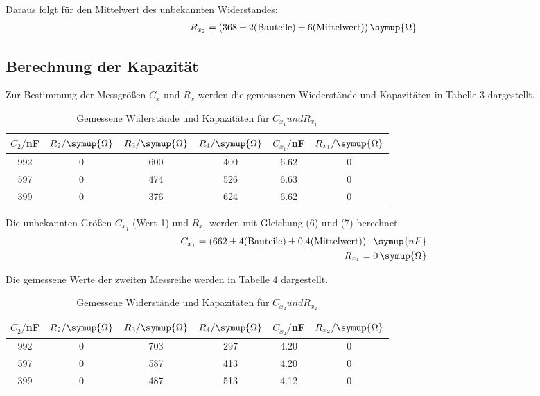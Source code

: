 Daraus folgt für den Mittelwert des unbekannten Widerstandes:
\begin{align*}
  R_{x_2} = (368 \pm 2\text{(Bauteile)} \pm 6\text{(Mittelwert)}) \, \symup{\Omega}
\end{align*}


\subsection{Berechnung der Kapazität}
Zur Bestimmung der Messgrößen $C_x$ und $R_x$ werden die gemessenen Wiederstände und Kapazitäten in
Tabelle 3 dargestellt.

\begin{table}[H]
  \centering
  \caption{Gemessene Widerstände und Kapazitäten für $C_{x_1} und R_{x_1}$}
  \label{tab:Widerstand}
  \begin{tabular}{c c c c c c}
    \toprule
    $C_2/$nF & $R_2/ \symup{\Omega}$ & $R_3/ \symup{\Omega}$ & $R_4 / \symup{\Omega}$ & $C_{x_1}/$nF & $R_{x_1} / \symup{\Omega}$\\
    \midrule
    992 & 0 & 600 & 400 & 6.62  & 0\\
    597 & 0 & 474 & 526 & 6.63  & 0\\
    399 & 0 & 376 & 624 & 6.62  & 0\\
    \bottomrule
  \end{tabular}
\end{table}

Die unbekannten Größen $C_{x_1}$ (Wert 1) und $R_{x_1}$ werden mit Gleichung (6) und (7) berechnet.
\begin{align*}
  C_{x_1} = (662 \pm 4\text{(Bauteile)} \pm 0.4\text{(Mittelwert)}) \cdot  \symup{nF} \\
  R_{x_1} = 0  \, \symup{\Omega}
\end{align*}

Die gemessene Werte der zweiten Messreihe werden in Tabelle 4 dargestellt.

\begin{table}[H]
  \centering
  \caption{Gemessene Widerstände und Kapazitäten für $C_{x_2} und R_{x_2}$}
  \label{tab:Widerstand}
  \begin{tabular}{c c c c c c}
    \toprule
    $C_2/$nF & $R_2/ \symup{\Omega}$ & $R_3/ \symup{\Omega}$ & $R_4 / \symup{\Omega}$ & $C_{x_2}/$nF &  $R_{x_2} / \symup{\Omega}$\\
    \midrule
    992 & 0 & 703 & 297 &  4.20 & 0\\
    597 & 0 & 587 & 413 &  4.20 & 0\\
    399 & 0 & 487 & 513 &  4.12 & 0\\
    \bottomrule
  \end{tabular}
\end{table}

